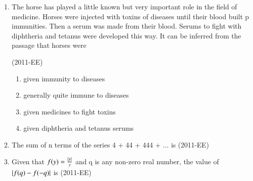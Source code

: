 \documentclass[journal]{IEEEtran}
\begin{document}
\begin{enumerate}
	\begin{enumerate}
	\end{enumerate}
\item The horse has played a little known but very important role in the field of medicine. Horses were injected with toxins of diseases until their blood built p immunities. Then a serum was made from their blood. Serums to fight with diphtheria and tetanus were developed this way.
	It can be inferred from the passage that horses were

 \hfill(2011-EE)
	\begin{enumerate}
		\item given immunity to diseases
		\item generally quite immune to diseases
		\item given medicines to fight toxins
		\item given diphtheria and tetanus serums
	\end{enumerate}
\item The sum of n terms of the series 4 + 44 + 444 + $\dots$ is \hfill(2011-EE)
	\begin{enumerate}
	\end{enumerate}
\item Given that $f(y) = \frac{\left\vert y\right\vert}{y}$ and q is any non-zero real number, the value of $\left\vert f(q) - f(-q)\right\vert$ is \hfill(2011-EE)
	\begin{enumerate}
			\begin{multicols}{4}
			\item 0
			\item -1
			\item 1
			\item 2
			\end{multicols}
	\end{enumerate}

\end{enumerate}
\end{document}
